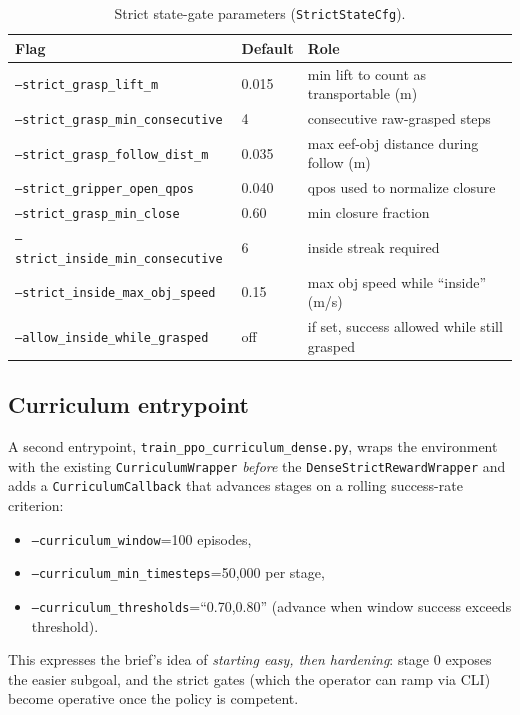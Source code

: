 \documentclass[11pt]{article}
\begin{document}
\begin{table}[h]
\centering
\caption{Strict state-gate parameters (\texttt{StrictStateCfg}).}
\label{tab:strict}
\begin{tabular}{lll}
\toprule
Flag & Default & Role \\
\midrule
\texttt{--strict\_grasp\_lift\_m}         & 0.015 & min lift to count as transportable (m) \\
\texttt{--strict\_grasp\_min\_consecutive}& 4     & consecutive raw-grasped steps \\
\texttt{--strict\_grasp\_follow\_dist\_m} & 0.035 & max eef-obj distance during follow (m) \\
\texttt{--strict\_gripper\_open\_qpos}    & 0.040 & qpos used to normalize closure \\
\texttt{--strict\_grasp\_min\_close}      & 0.60  & min closure fraction \\
\texttt{--strict\_inside\_min\_consecutive}& 6    & inside streak required \\
\texttt{--strict\_inside\_max\_obj\_speed}& 0.15  & max obj speed while ``inside'' (m/s) \\
\texttt{--allow\_inside\_while\_grasped}  & off   & if set, success allowed while still grasped \\
\bottomrule
\end{tabular}
\end{table}

\subsection{Curriculum entrypoint}
A second entrypoint, \texttt{train\_ppo\_curriculum\_dense.py}, wraps the
environment with the existing \texttt{CurriculumWrapper} \emph{before} the
\texttt{DenseStrictRewardWrapper} and adds a \texttt{CurriculumCallback} that
advances stages on a rolling success-rate criterion:
\begin{itemize}
  \item \texttt{--curriculum\_window}=100 episodes,
  \item \texttt{--curriculum\_min\_timesteps}=50{,}000 per stage,
  \item \texttt{--curriculum\_thresholds}=``0.70,0.80'' (advance when window
    success exceeds threshold).
\end{itemize}
This expresses the brief's idea of \emph{starting easy, then hardening}: stage
$0$ exposes the easier subgoal, and the strict gates (which the operator can
ramp via CLI) become operative once the policy is competent.
\end{document}
